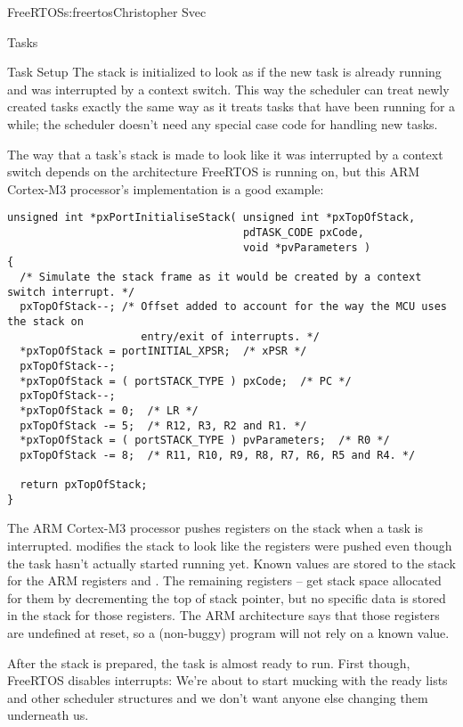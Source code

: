 \begin{aosachapter}{FreeRTOS}{s:freertos}{Christopher Svec}
\begin{aosasect1}{Tasks}
\begin{aosasect2}{Task Setup}
The stack is initialized to look as if the new task is already running
and was interrupted by a context switch. This way the scheduler can
treat newly created tasks exactly the same way as it treats tasks that have
been running for a while; the scheduler doesn't need any
special case code for handling new tasks.

The way that a task's stack is made to look like it was interrupted by
a context switch depends on the architecture FreeRTOS is running on,
but this ARM Cortex-M3 processor's implementation is a good example:

\begin{verbatim}
unsigned int *pxPortInitialiseStack( unsigned int *pxTopOfStack, 
                                     pdTASK_CODE pxCode,
                                     void *pvParameters )
{
  /* Simulate the stack frame as it would be created by a context switch interrupt. */
  pxTopOfStack--; /* Offset added to account for the way the MCU uses the stack on 
                     entry/exit of interrupts. */
  *pxTopOfStack = portINITIAL_XPSR;  /* xPSR */
  pxTopOfStack--;
  *pxTopOfStack = ( portSTACK_TYPE ) pxCode;  /* PC */
  pxTopOfStack--;
  *pxTopOfStack = 0;  /* LR */
  pxTopOfStack -= 5;  /* R12, R3, R2 and R1. */
  *pxTopOfStack = ( portSTACK_TYPE ) pvParameters;  /* R0 */
  pxTopOfStack -= 8;  /* R11, R10, R9, R8, R7, R6, R5 and R4. */
  
  return pxTopOfStack;
}
\end{verbatim}

The ARM Cortex-M3 processor pushes registers on the stack when a task
is interrupted. \linebreak {} modifies the stack to
look like the registers were pushed even though the task hasn't
actually started running yet.  Known values are stored to the stack
for the ARM registers  and . The
remaining registers  --  get stack space allocated for them
by decrementing the top of stack pointer, but no specific data is
stored in the stack for those registers. The ARM architecture says
that those registers are undefined at reset, so a (non-buggy) program
will not rely on a known value.

After the stack is prepared, the task is almost ready to run.  First
though, FreeRTOS disables interrupts: We're about to start mucking
with the ready lists and other scheduler structures and we don't want
anyone else changing them underneath us.


\end{aosasect2}
\end{aosasect1}
\end{aosachapter}
